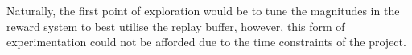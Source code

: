 \documentclass[ %
                    author={Ashwinder Khurana},
                supervisor={Prof Dave Cliff},
                    degree={MEng},
                     title={The Deeply Reinforced Trader},
                  subtitle={},
                      type={enterprise},
                      year={2020} ]{dissertation}
\begin{document}
{\\
\\
\noindent 
Naturally, the first point of exploration would be to tune the magnitudes in the reward system to best utilise the replay buffer, however, this form of experimentation could not be afforded due to the time constraints of the project.

 








%
%
%
%


}
\end{document}

